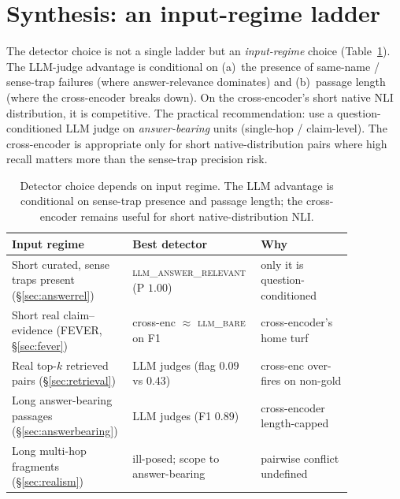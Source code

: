 \documentclass[sigconf, nonacm, natbib]{acmart}
\begin{document}


\section{Synthesis: an input-regime ladder}
\label{sec:synthesis}
The detector choice is not a single ladder but an \emph{input-regime} choice
(Table~\ref{tab:synthesis}). The LLM-judge advantage is conditional on
(a)~the presence of same-name / sense-trap failures (where answer-relevance dominates)
and (b)~passage length (where the cross-encoder breaks down). On the cross-encoder's
short native NLI distribution, it is competitive. The practical recommendation: use a
question-conditioned LLM judge on \emph{answer-bearing} units (single-hop / claim-level).
The cross-encoder is appropriate only for short native-distribution pairs where high
recall matters more than the sense-trap precision risk.

\begin{table}[t]
\centering
\footnotesize
\begin{tabular}{@{}p{0.28\linewidth}p{0.32\linewidth}p{0.26\linewidth}@{}}
\toprule
Input regime & Best detector & Why \\
\midrule
Short curated, sense traps present (\S\ref{sec:answerrel}) &
  \textsc{llm\_answer\_relevant} (P $1.00$) & only it is question-conditioned \\
Short real claim--evidence (FEVER, \S\ref{sec:fever}) &
  cross-enc $\approx$ \textsc{llm\_bare} on F1 & cross-encoder's home turf \\
Real top-$k$ retrieved pairs (\S\ref{sec:retrieval}) &
  LLM judges (flag $0.09$ vs $0.43$) & cross-enc over-fires on non-gold \\
Long answer-bearing passages (\S\ref{sec:answerbearing}) &
  LLM judges (F1 $0.89$) & cross-encoder length-capped \\
Long multi-hop fragments (\S\ref{sec:realism}) &
  ill-posed; scope to answer-bearing & pairwise conflict undefined \\
\bottomrule
\end{tabular}
\caption{Detector choice depends on input regime. The LLM advantage is conditional on
sense-trap presence and passage length; the cross-encoder remains useful for short
native-distribution NLI.}
\label{tab:synthesis}
\end{table}
\end{document}
